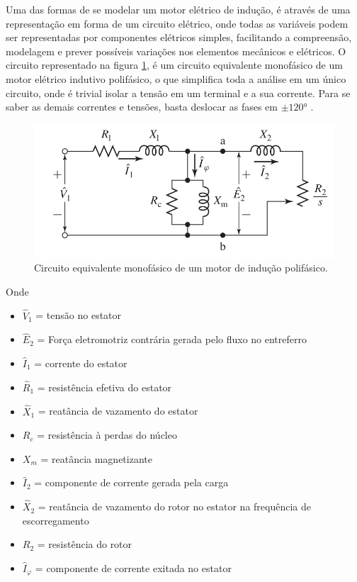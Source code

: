 Uma das formas de se modelar um motor elétrico de indução, é através de uma representação em forma de um circuito 
elétrico, onde todas as variáveis podem ser representadas por componentes elétricos simples, facilitando a compreensão, modelagem e
prever possíveis variações nos elementos mecânicos e elétricos. O circuito representado na figura \ref{fig:circuit_fitzgerald_p354},
é um circuito equivalente monofásico de um motor elétrico indutivo polifásico, o que simplifica toda a análise em um único circuito,
onde é trivial isolar a tensão em um terminal e a sua corrente. Para se saber as demais correntes e tensões, basta deslocar as fases
em $\pm\ang{120}$ \cite{Umans2003}.

\begin{figure}[H]
    \caption{Circuito equivalente monofásico de um motor de indução polifásico.}
    \begin{center}
        \includegraphics[scale=.35]{referencial/img/circuit_fitzgerald_p354.png}
    \end{center}
    \label{fig:circuit_fitzgerald_p354}
\end{figure}

Onde

\begin{itemize}
    \item $\hat{V}_1$ = tensão no estator
    \item $\hat{E}_2$ = Força eletromotriz contrária gerada pelo fluxo no entreferro
    \item $\hat{I}_1$ = corrente do estator
    \item $\hat{R}_1$ = resistência efetiva do estator
    \item $\hat{X}_1$ = reatância de vazamento do estator
    \item $R_c$ = resistência à perdas do núcleo
    \item $X_m$ = reatância magnetizante
    \item $\hat{I}_2$ = componente de corrente gerada pela carga
    \item $\hat{X}_2$ = reatância de vazamento do rotor no estator na frequência de escorregamento
    \item $R_2$ = resistência do rotor
    \item $\hat{I}_\varphi$ = componente de corrente exitada no estator
\end{itemize}

